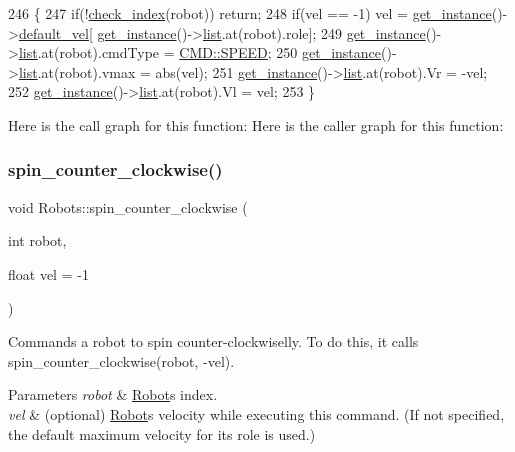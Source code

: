 \begin{DoxyCode}
246                                                 \{
247     \textcolor{keywordflow}{if}(!\hyperlink{robots_8hpp_ae3e6ae8f87cdc750c0b99bc609d9ae43}{check\_index}(robot)) \textcolor{keywordflow}{return};
248     \textcolor{keywordflow}{if}(vel == -1) vel = \hyperlink{class_robots_a589bce74db5f34af384952d48435168f}{get\_instance}()->\hyperlink{class_robots_a6c03d49137645a67d5c5e39bb953a788}{default\_vel}[
      \hyperlink{class_robots_a589bce74db5f34af384952d48435168f}{get\_instance}()->\hyperlink{class_robots_a2c6b77265028f82a4342ca1ef15ed305}{list}.at(robot).role];
249     \hyperlink{class_robots_a589bce74db5f34af384952d48435168f}{get\_instance}()->\hyperlink{class_robots_a2c6b77265028f82a4342ca1ef15ed305}{list}.at(robot).cmdType = \hyperlink{serial_w_8hpp_aac3553b3932cbfeeac4526ce7ca0336b}{CMD::SPEED};
250     \hyperlink{class_robots_a589bce74db5f34af384952d48435168f}{get\_instance}()->\hyperlink{class_robots_a2c6b77265028f82a4342ca1ef15ed305}{list}.at(robot).vmax = abs(vel);
251     \hyperlink{class_robots_a589bce74db5f34af384952d48435168f}{get\_instance}()->\hyperlink{class_robots_a2c6b77265028f82a4342ca1ef15ed305}{list}.at(robot).Vr = -vel;
252     \hyperlink{class_robots_a589bce74db5f34af384952d48435168f}{get\_instance}()->\hyperlink{class_robots_a2c6b77265028f82a4342ca1ef15ed305}{list}.at(robot).Vl = vel;
253 \}
\end{DoxyCode}
Here is the call graph for this function\+:
Here is the caller graph for this function\+:
\mbox{\label{class_robots_a54c13103d74e172273acf2e56ba5e8fb}} 
\subsubsection{\texorpdfstring{spin\+\_\+counter\+\_\+clockwise()}{spin\_counter\_clockwise()}}
{\footnotesize\ttfamily void Robots\+::spin\+\_\+counter\+\_\+clockwise (\begin{DoxyParamCaption}\item[{int}]{robot,  }\item[{float}]{vel = {\ttfamily -\/1} }\end{DoxyParamCaption})\hspace{0.3cm}{\ttfamily [static]}}

Commands a robot to spin counter-\/clockwiselly. To do this, it calls spin\+\_\+counter\+\_\+clockwise(robot, -\/vel). 
\begin{DoxyParams}{Parameters}
{\em robot} & \hyperlink{struct_robots_1_1_robot}{Robot}\textquotesingle{}s index. \\
\hline
{\em vel} & (optional) \hyperlink{struct_robots_1_1_robot}{Robot}\textquotesingle{}s velocity while executing this command. (If not specified, the default maximum velocity for it\textquotesingle{}s role is used.) \\
\hline
\end{DoxyParams}


